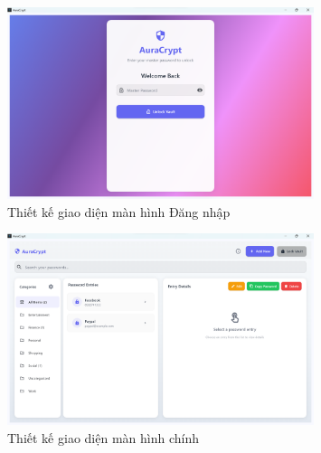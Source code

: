 \begin{figure}[H]
    \centering
    \includegraphics[width=0.8\textwidth]{images/mock_login_screen.png}
    \caption{Thiết kế giao diện màn hình Đăng nhập}
    \label{fig:login_screen}
\end{figure}

\begin{figure}[H]
    \centering
    \includegraphics[width=0.8\textwidth]{images/mock_main_screen.png}
    \caption{Thiết kế giao diện màn hình chính}
    \label{fig:main_screen}
\end{figure}
\newpage